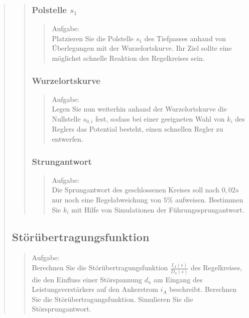 \begin{quote}
\begin{quote}
\begin{quote}
        \end{quote}


        \subsubsection{Polstelle $s_1$}
        \begin{quote}
            Aufgabe:\\
            Platzieren Sie die Polstelle $s_1$ des Tiefpasses anhand von Überlegungen mit der
            Wurzelortskurve. Ihr Ziel sollte eine möglichst schnelle Reaktion des Regelkreises
            sein.\\
            
        \end{quote}
        
        
        \subsubsection{Wurzelortskurve}

        \begin{quote}
            Aufgabe:\\
            Legen Sie nun weiterhin anhand der Wurzelortskurve die Nullstelle $s_{0,i}$
            fest, sodass bei einer geeigneten Wahl von $k_i$ des Reglers
            das Potential besteht, einen schnellen Regler zu entwerfen.\\
        
        \end{quote}
            
        
        \subsubsection{Strungantwort}

        \begin{quote}
            Aufgabe:\\
            Die Sprungantwort des geschlossenen Kreises soll nach $0,02s$ nur noch eine Regelabweichung von $5\%$
            aufweisen. Bestimmen Sie $k_i$ mit Hilfe von Simulationen der Führungssprungantwort.\\
        
	 	
        \end{quote}

    \end{quote}
    
    
    \subsection{Störübertragungsfunktion}
    \begin{quote}
        Aufgabe:\\
        Berechnen Sie die Störübertragungsfunktion $\frac{I_A(s)}{D_u(s)}$ des Regelkreises, die den Einfluss
        einer Störspannung $d_u$ am Eingang des Leistungsverstärkers auf den Ankerstrom $i_A$ beschreibt.
        Berechnen Sie die Störübertragungsfunktion. Simulieren Sie die Störsprungantwort.\\
        

\end{quote}
\end{quote}
